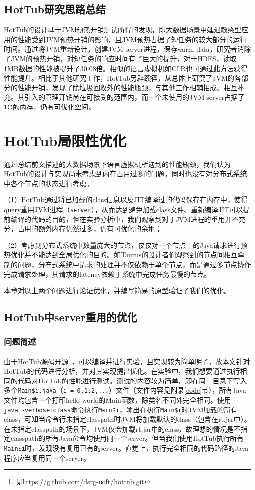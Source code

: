 \documentclass[lang=cn,12pt,a4paper,cite=authoryear]{elegantpaper}
\begin{document}
\subsection{HotTub研究思路总结}
HotTub的设计基于JVM预热开销测试所得的发现，即大数据场景中延迟敏感型应用的性能受到JVM预热开销的影响，且JVM预热占据了短任务的较大部分的运行时间。通过将JVM重新设计，创建JVM server进程，保存warm data，研究者消除了JVM的预热开销，对短任务的响应时间有了巨大的提升，对于HDFS，读取1MB数据的性能被提升了30.08倍。相似的语言虚拟机如CLR也可通过此方法获得性能提升。相比于其他研究工作，HotTub另辟蹊径，从总体上研究了JVM的各部分的性能开销，发现了除垃圾回收外的性能瓶颈，与其他工作相辅相成、相互补充。其引入的管理开销尚在可接受的范围内，而一个未使用的JVM server占据了1G的内存，仍有可优化空间。

\section{HotTub局限性优化}
通过总结前文描述的大数据场景下语言虚拟机所遇到的性能瓶颈，我们认为HotTub的设计与实现尚未考虑到内存占用过多的问题，同时也没有对分布式系统中各个节点的状态进行考虑。

（1）HotTub通过将已加载的class信息以及JIT编译过的代码保存在内存中，使得query重用JVM进程（\texttt{server}），从而达到避免加载class文件、重新编译JIT可以提前编译的代码的目的，但在实验分析中，我们观察到对于JVM进程的重用并不充分，占用的额外内存仍然过多，仍有可优化的余地；

（2）考虑到分布式系统中数量庞大的节点，仅仅对一个节点上的Java请求进行预热优化并不能达到全局优化的目的。如Taurus\cite{DBLP:conf/asplos/MaasA0K16}的设计者们观察到的节点间相互牵制的问题，分布式系统中请求的处理并不仅依赖于单个节点，而是通过多节点协作完成请求处理，其请求的latency依赖于系统中完成任务最慢的节点。

本章对以上两个问题进行论证优化，并编写简易的原型验证了我们的优化。

\subsection{HotTub中server重用的优化}
\subsubsection{问题简述}
由于HotTub源码开源\footnote{见https://github.com/dsrg-uoft/hottub.git}，可以编译并进行实验，且实现较为简单明了，故本文针对HotTub的代码进行分析，并对其实现提出优化。在实验中，我们想要通过执行相同的代码对HotTub的性能进行测试。测试的内容较为简单，即在同一目录下写入多个\texttt{Main\$i.java}（\texttt{i = 0,1,2,...}）文件（文件内容见附录\ref{code}节），所有Java文件均包含一个打印hello world的Main函数，除类名不同外完全相同。使用\texttt{java\ -verbose:class}命令执行\texttt{Main\$i}，输出在执行\texttt{Main\$i}时JVM加载的所有class，可知当命令行未指定classpath时JVM将加载默认的class（包含在rt.jar中）。在未指定classpath的场景下，JVM仅会加载rt.jar中的class，故理想的情况是不指定classpath的所有Java命令均使用同一个server。但当我们使用HotTub执行所有\texttt{Main\$i}时，发现没有复用已有的server。直觉上，执行完全相同的代码路径的Java程序应当复用同一个server。
\end{document}
